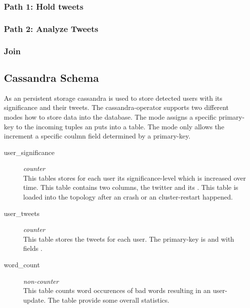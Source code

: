 \subsubsection{Path 1: Hold tweets}


\subsubsection{Path 2: Analyze Tweets}

\subsubsection{Join}


\subsection{Cassandra Schema}
As an persistent storage cassandra is used to store detected users with its significance and their tweets. The cassandra-operator supports two different modes how to store data into the database. The  mode assigns a specific primary-key to the incoming tuples an puts into a table. The  mode only allows the increment a specific coulmn field determined by a primary-key.  

\begin{description}
  \item[user\_significance] \textit{counter} \hfill \\
  This tables stores for each user its significance-level which is increased over time. This table contains two columns, the twitter  and its . This table is loaded into the topology after an crash or an cluster-restart happened.
  
  \item[user\_tweets] \textit{counter}  \hfill \\
  This table stores the tweets for each user. The primary-key is  and  with fields .
  
  \item[word\_count]  \textit{non-counter} \hfill \\
  This table counts word occurences of bad words resulting in an user-update. The table provide some overall statistics.
  
\end{description}
    